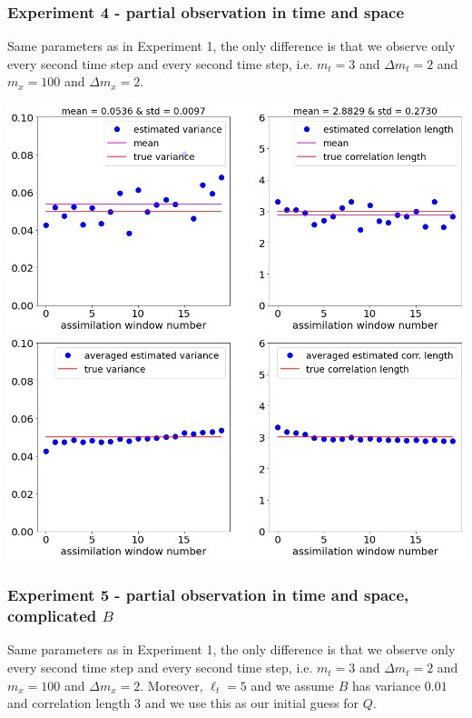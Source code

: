 \documentclass[a4paper,10pt]{article}
\numberwithin{equation}{section}
\begin{document}
\newpage
\subsubsection*{Experiment 4 - partial observation in time and space}
Same parameters as in Experiment 1, the only difference is that we observe only every second time step and every second time step, i.e. $m_t=3$ and $\Delta m_t=2$ and $m_x=100$ and $\Delta m_x=2$. 


\includegraphics[scale=0.4]{Ex4}

\subsubsection*{Experiment 5 - partial observation in time and space, complicated $B$}
Same parameters as in Experiment 1, the only difference is that we observe only every second time step and every second time step, i.e. $m_t=3$ and $\Delta m_t=2$ and $m_x=100$ and $\Delta m_x=2$. Moreover, $\ell_t=5$ and we assume $B$ has variance $0.01$ and correlation length $3$ and we use this as our initial guess for $Q$. 
\end{document}
